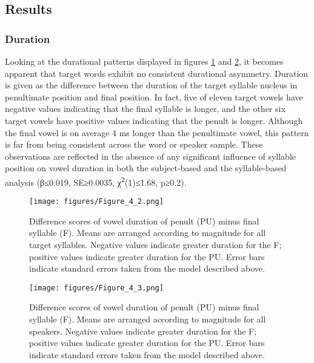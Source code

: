 \subsection{Results}
\subsubsection{Duration}
Looking at the durational patterns displayed in  figures \ref{fig:4.2} and \ref{fig:4.3}, it becomes apparent that target words exhibit no consistent durational asymmetry. Duration is given as the difference between the duration of the target syllable nucleus in penultimate position and final position. In fact, five of eleven target vowels have negative values indicating that the final syllable is longer, and the other six target vowels have positive values indicating that the penult is longer. Although the final vowel is on average 4 ms longer than the penultimate vowel, this pattern is far from being consistent across the word or speaker sample. These observations are reflected in the absence of any significant influence of syllable position on vowel duration in both the subject-based and the syllable-based analysis (β≤0.019, SE≥0.0035, χ\textsuperscript{2}(1)≤1.68, p≥0.2). 

\begin{figure}
  \centering 
   \texttt{[image: figures/Figure\_4\_2.png]}
  \caption{Difference scores of vowel duration of penult (PU) minus final syllable (F). Means are arranged according to magnitude for all target syllables. Negative values indicate greater duration for the F; positive values indicate greater duration for the PU. Error bars indicate standard errors taken from the model described above.}
   \label{fig:4.2}
   \end{figure}

\begin{figure}
  \centering 
   \texttt{[image: figures/Figure\_4\_3.png]}
  \caption{Difference scores of vowel duration of penult (PU) minus final syllable (F). Means are arranged according to magnitude for all speakers. Negative values indicate greater duration for the F; positive values indicate greater duration for the PU. Error bars indicate standard errors taken from the model described above.}
   \label{fig:4.3}
   \end{figure}

